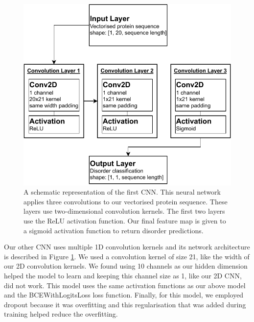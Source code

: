 \documentclass{l4proj}
\begin{document}
\begin{figure}[!ht]
    \centering
    \includegraphics[width=0.75\linewidth]{images/2DCNNdraw.pdf}    

    \caption{A schematic representation of the first CNN. This neural network applies three convolutions to our vectorised protein sequence. These layers use two-dimensional convolution kernels. The first two layers use the ReLU activation function. Our final feature map is given to a sigmoid activation function to return disorder predictions.}

    \label{fig:2DCNN} 
\end{figure}

Our other CNN uses multiple 1D convolution kernels and its network architecture is described in Figure \ref{fig:2DCNN}. We used a convolution kernel of size 21, like the width of our 2D convolution kernels. We found using 10 channels as our hidden dimension helped the model to learn and keeping this channel size as 1, like our 2D CNN, did not work. This model uses the same activation functions as our above model and the BCEWithLogitsLoss loss function. Finally, for this model, we employed dropout because it was overfitting and this regularisation that was added during training helped reduce the overfitting.
\end{document}
